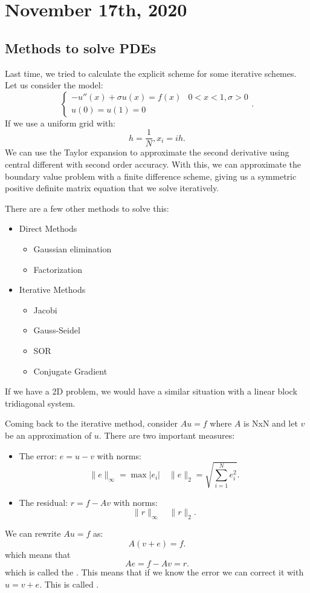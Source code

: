\documentclass[../main/main.tex]{subfiles}
\begin{document}
\section{November 17th, 2020}
\subsection{Methods to solve PDEs}
Last time, we tried to calculate the explicit scheme for some iterative schemes. Let us consider the model: \[
\begin{cases}
    -u''(x) + \sigma u(x) = f(x) & 0 < x < 1, \sigma > 0\\
    u(0) = u(1) = 0
\end{cases}
.\] 
If we use a uniform grid with: \[
h = \frac{1}{N}, x_i = ih
.\] We can use the Taylor expansion to approximate the second derivative using central different with second order accuracy. With this, we can approximate the boundary value problem with a finite difference scheme, giving us a symmetric positive definite matrix equation that we solve iteratively. 

There are a few other methods to solve this: 
\begin{itemize}
    \item Direct Methods
        \begin{itemize}
            \item Gaussian elimination
            \item Factorization
        \end{itemize}
    \item Iterative Methods
        \begin{itemize}
            \item Jacobi
            \item Gauss-Seidel
            \item SOR
            \item Conjugate Gradient
        \end{itemize}
\end{itemize}

If we have a 2D problem, we would have a similar situation with a linear block tridiagonal system.  

Coming back to the iterative method, consider $Au=f$ where $A$ is NxN and let $v$ be an approximation of $u$. There are two important measures: 
\begin{itemize}
    \item The error: $e=u-v$ with norms: \[
    \|e\|_\infty = \max |e_i| \quad \|e\|_2 = \sqrt{\sum_{i=1}^{N} e_i^2} 
    .\] 
\item The residual: $r=f-Av$ with norms: \[
\|r\|_\infty \quad \|r\|_2
.\] 
\end{itemize}
We can rewrite $Au=f$ as: \[
    A(v+e) = f
.\] which means that \[
Ae = f - Av = r
.\] which is called the . This means that if we know the error we can correct it with $u=v+e$. This is called .
\end{document}
